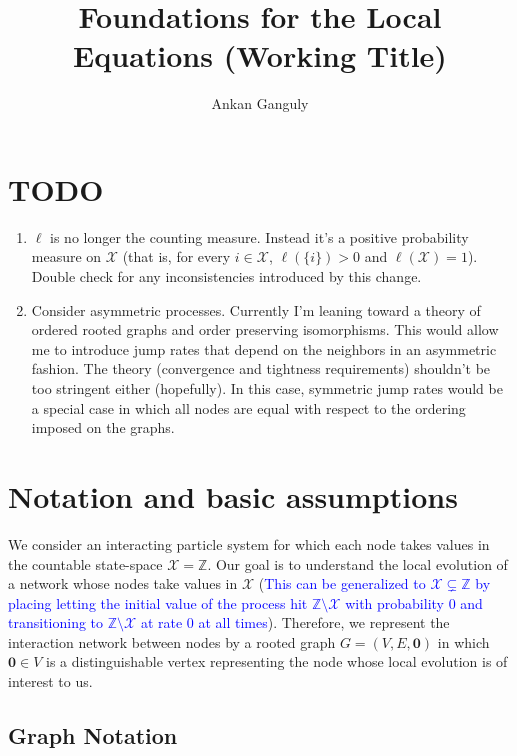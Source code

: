 \documentclass[12pt]{article}
\newcommand{\mb}{\mathbb}
\newcommand{\mc}{\mathcal}
\newcommand{\tb}{\textcolor{blue}}
\newcommand{\sta}{\mc{X}}							%
\renewcommand{\root}{\mathbf{0}}					%
\newcommand{\Sm}{\ell}								%
\begin{document}
\title{Foundations for the Local Equations (Working Title)}
\author{Ankan Ganguly}

\maketitle

\section{TODO}

\begin{enumerate}
\item \(\Sm\) is no longer the counting measure. Instead it's a positive probability measure on \(\sta\) (that is, for every \(i \in \sta\), \(\Sm(\{i\}) > 0\) and \(\Sm(\sta) = 1\)). Double check for any inconsistencies introduced by this change.

\item Consider asymmetric processes. Currently I'm leaning toward a theory of ordered rooted graphs and order preserving isomorphisms. This would allow me to introduce jump rates that depend on the neighbors in an asymmetric fashion. The theory (convergence and tightness requirements) shouldn't be too stringent either (hopefully). In this case, symmetric jump rates would be a special case in which all nodes are equal with respect to the ordering imposed on the graphs.
\end{enumerate}



\section{Notation and basic assumptions}
\label{not}

We consider an interacting particle system for which each node takes values in the countable state-space \(\sta = \mb{Z}\). Our goal is to understand the local evolution of a network whose nodes take values in \(\sta\) (\tb{This can be generalized to \(\sta \subsetneq \mb{Z}\) by placing letting the initial value of the process hit \(\mb{Z}\setminus \sta\) with probability 0 and transitioning to \(\mb{Z}\setminus \sta\) at rate 0 at all times}). Therefore, we represent the interaction network between nodes by a rooted graph \(G = (V,E,\root)\) in which \(\root \in V\) is a distinguishable vertex representing the node whose local evolution is of interest to us.

\subsection{Graph Notation}
\label{not::g}
\end{document}

